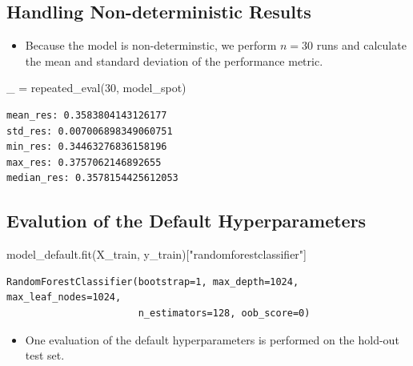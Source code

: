 \documentclass[
  letterpaper,
  DIV=11,
  numbers=noendperiod]{scrreprt}
\newenvironment{Shaded}{\begin{snugshade}}{\end{snugshade}}
\newcommand{\DecValTok}[1]{\textcolor[rgb]{0.68,0.00,0.00}{#1}}
\newcommand{\NormalTok}[1]{\textcolor[rgb]{0.00,0.23,0.31}{#1}}
\newcommand{\OperatorTok}[1]{\textcolor[rgb]{0.37,0.37,0.37}{#1}}
\newcommand{\StringTok}[1]{\textcolor[rgb]{0.13,0.47,0.30}{#1}}
\providecommand{\tightlist}{%
  \setlength{\itemsep}{0pt}\setlength{\parskip}{0pt}}\usepackage{longtable,booktabs,array}
\begin{document}
\hypertarget{handling-non-deterministic-results}{%
\subsection{Handling Non-deterministic
Results}\label{handling-non-deterministic-results}}

\begin{itemize}
\tightlist
\item
  Because the model is non-determinstic, we perform \(n=30\) runs and
  calculate the mean and standard deviation of the performance metric.
\end{itemize}

\begin{Shaded}
\begin{Highlighting}[]
\NormalTok{\_ }\OperatorTok{=}\NormalTok{ repeated\_eval(}\DecValTok{30}\NormalTok{, model\_spot)}
\end{Highlighting}
\end{Shaded}

\begin{verbatim}
mean_res: 0.3583804143126177
std_res: 0.007006898349060751
min_res: 0.34463276836158196
max_res: 0.3757062146892655
median_res: 0.3578154425612053
\end{verbatim}

\hypertarget{evalution-of-the-default-hyperparameters}{%
\subsection{Evalution of the Default
Hyperparameters}\label{evalution-of-the-default-hyperparameters}}

\begin{Shaded}
\begin{Highlighting}[]
\NormalTok{model\_default.fit(X\_train, y\_train)[}\StringTok{"randomforestclassifier"}\NormalTok{]}
\end{Highlighting}
\end{Shaded}

\begin{verbatim}
RandomForestClassifier(bootstrap=1, max_depth=1024, max_leaf_nodes=1024,
                       n_estimators=128, oob_score=0)
\end{verbatim}

\begin{itemize}
\tightlist
\item
  One evaluation of the default hyperparameters is performed on the
  hold-out test set.
\end{itemize}
\end{document}
